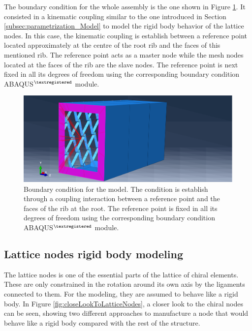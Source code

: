     The boundary condition for the whole assembly is the one shown in Figure \ref{fig:fixed}. It consisted in a kinematic coupling similar to the one introduced in Section \ref{subsec:parametrization_Model} to model the rigid body behavior of the lattice nodes. In this case, the kinematic coupling is establish between a reference point located approximately at the centre of the root rib and the faces of this mentioned rib. The reference point acts as a master node while the mesh nodes located at the faces of the rib are the slave nodes. The reference point is next fixed in all its degrees of freedom using the corresponding boundary condition ABAQUS$^{\textregistered}$ module.

    \begin{figure}[!htpb]
      \centering
      \includegraphics[width=0.8 \textwidth]{figures/result-model/fixed}
      \caption[Boundary condition for the model]{Boundary condition for the model. The condition is establish through a coupling interaction between a reference point and the faces of the rib at the root. The reference point is fixed in all its degrees of freedom using the corresponding boundary condition ABAQUS$^{\textregistered}$ module.}\label{fig:fixed}
    \end{figure}

  \clearpage
  \subsection{Lattice nodes rigid body modeling} \label{subsec:latticeNodesRigid_Parametrization}

    The lattice nodes is one of the essential parts of the lattice of chiral elements. These are only constrained in the rotation around its own axis by the ligaments connected to them. For the modeling, they are assumed to behave like a rigid body. In Figure \ref{fig:closeLookToLatticeNodes}, a closer look to the chiral nodes can be seen, showing two different approaches to manufacture a node that would behave like a rigid body compared with the rest of the structure.

